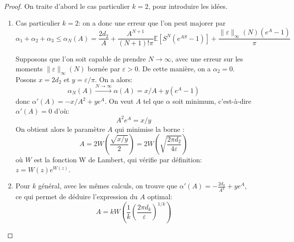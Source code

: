 \documentclass[12pt]{article}
\newcommand{\pth}[1]{\left(#1\right)}
\newcommand{\cro}[1]{\left[#1\right]}
\newcommand{\dabs}[1]{\|#1\|}
\newcommand{\Esp}[1]{\mathbb{E}\cro{#1}}
\begin{document}
\begin{proof} On traite d'abord le cas particulier $k=2$, pour introduire les idées.
\begin{enumerate}
\item Cas particulier $k=2$: on a donc une erreur que l'on peut majorer par
\[\alpha_1+\alpha_2+\alpha_3 \leqslant \alpha_N(A)=\frac{2d_2}{A}+\frac{A^{N+1}}{(N+1)!\pi}\Esp{S^N(e^{AS}-1)}+\frac{\dabs{\varepsilon}_{\infty}(N)(e^A-1)}{\pi}\]

Supposons que l'on soit capable de prendre $N\to\infty$, avec une erreur sur les moments $\dabs{\varepsilon}_{\infty}(N)$ bornée par $\varepsilon>0$. De cette manière, on a $\alpha_2=0$. Posons $x=2d_2$ et $y=\varepsilon/\pi$. On a alors:
\[\alpha_N(A)\xrightarrow{N\to\infty}\alpha(A)=x/A+y(e^A-1)\]
donc $\alpha'(A)=-x/A^2+ye^A$. On veut $A$ tel que $\alpha$ soit minimum, c'est-à-dire $\alpha'(A)=0$ d'où:
\[A^2e^A=x/y\]
On obtient alors le paramètre $A$ qui minimise la borne : 
\[A = 2W\pth{\frac{\sqrt{x/y}}2} = 2W\pth{\sqrt{\frac{2\pi d_2}{4 \varepsilon}}}\]
où $W$ est la fonction W de Lambert, qui vérifie par définition: $z=W(z)e^{W(z)}$.

\item Pour $k$ général, avec les mêmes calculs, on trouve que $\alpha'(A)=-\frac{2d_k}{A^k}+ye^A$, ce qui permet de déduire l'expression du $A$ optimal:
\[A=kW\pth{\frac{1}{k}\pth{\frac{2\pi d_k}{\varepsilon}}^{1/k}}\]


\end{enumerate}
\end{proof}
\end{document}

